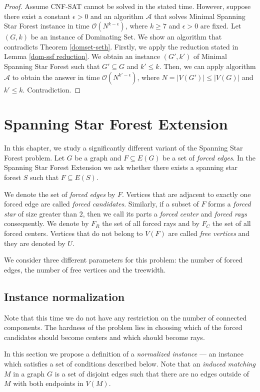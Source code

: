 \documentclass[en]{pracamgr}
\theoremstyle{definition}
\newcommand{\ssf}{spanning star forest}
\newcommand{\ssfp}{{\sc Spanning Star Forest}}
\newcommand{\mssfp}{{\sc Minimal Spanning Star Forest}}
\newcommand{\ssfep}{{\sc Spanning Star Forest Extension}}
\newcommand{\domsetp}{{\sc Dominating Set}}
\newcommand{\cnfsat}{{\sc CNF-SAT}}
\begin{document}
\begin{proof}
	Assume \cnfsat{} cannot be solved in the stated time. However, suppose there exist a constant $\epsilon > 0$ and an algorithm $\mathcal{A}$ that solves \mssfp{} instance in time $\mathcal{O}(N^{k-\epsilon})$, where $k \geq 7$ and $\epsilon > 0$ are fixed. Let $(G,k)$ be an instance of \domsetp{}. We show an algorithm that contradicts Theorem \ref{domset-seth}. Firstly, we apply the reduction stated in Lemma \ref{dom-ssf reduction}. We obtain an instance $(G',k')$ of \mssfp{} such that $G' \subseteq G$ and $k' \leq k$. Then, we can apply algorithm $\mathcal{A}$ to obtain the answer in time $\mathcal{O}(N^{k'-\epsilon})$, where $N=|V(G')| \leq |V(G)|$ and $k'\leq k$. Contradiction.
\end{proof}

\chapter{Spanning Star Forest Extension}\label{sec5}

In this chapter, we study a significantly different variant of the \ssfp{} problem. Let $G$ be a graph and $F \subseteq E(G)$ be a set of \emph{forced edges}. In the \ssfep{} we ask whether there exists a \ssf{} $S$ such that $F \subseteq E(S)$.

We denote the set of \emph{forced edges} by $F$. Vertices that are adjacent to exactly one forced edge are called \emph{forced candidates}. Similarly, if a subset of $F$ forms a \emph{forced star} of size greater than $2$, then we call its parts a \emph{forced center} and \emph{forced rays} consequently. We denote by $F_R$ the set of all forced rays and by $F_C$ the set of all forced centers. Vertices that do not belong to $V(F)$ are called \emph{free vertices} and they are denoted by $U$. 

We consider three different parameters for this problem: the number of forced edges, the number of free vertices and the treewidth. 

\section{Instance normalization} 

Note that this time we do not have any restriction on the number of connected components. The hardness of the problem lies in choosing which of the forced candidates should become centers and which should become rays. 

In this section we propose a definition of a \emph{normalized instance} --- an instance which satisfies a set of conditions described below. Note that an \emph{induced matching} $M$ in a graph $G$ is a set of disjoint edges such that there are no edges outside of $M$ with both endpoints in $V(M)$.
\end{document}
